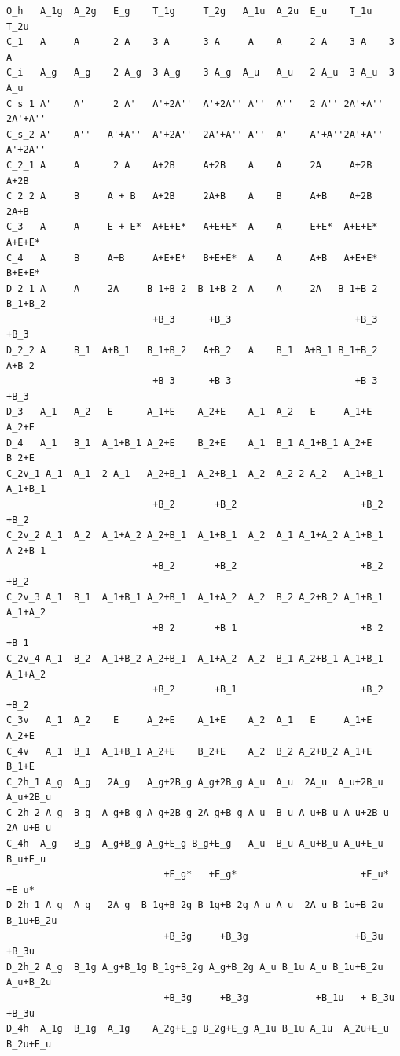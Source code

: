 \documentclass[12pt,a4paper]{article}
\begin{document}
\begin{verbatim}
O_h   A_1g  A_2g   E_g    T_1g     T_2g   A_1u  A_2u  E_u    T_1u   T_2u
C_1   A     A      2 A    3 A      3 A     A    A     2 A    3 A    3 A
C_i   A_g   A_g    2 A_g  3 A_g    3 A_g  A_u   A_u   2 A_u  3 A_u  3 A_u
C_s_1 A'    A'     2 A'   A'+2A''  A'+2A'' A''  A''   2 A'' 2A'+A'' 2A'+A''
C_s_2 A'    A''   A'+A''  A'+2A''  2A'+A'' A''  A'    A'+A''2A'+A'' A'+2A''
C_2_1 A     A      2 A    A+2B     A+2B    A    A     2A     A+2B   A+2B   
C_2_2 A     B     A + B   A+2B     2A+B    A    B     A+B    A+2B   2A+B
C_3   A     A     E + E*  A+E+E*   A+E+E*  A    A     E+E*  A+E+E*  A+E+E*
C_4   A     B     A+B     A+E+E*   B+E+E*  A    A     A+B   A+E+E*  B+E+E*
D_2_1 A     A     2A     B_1+B_2  B_1+B_2  A    A     2A   B_1+B_2  B_1+B_2
                          +B_3      +B_3                      +B_3     +B_3
D_2_2 A     B_1  A+B_1   B_1+B_2   A+B_2   A    B_1  A+B_1 B_1+B_2  A+B_2
                          +B_3      +B_3                      +B_3   +B_3
D_3   A_1   A_2   E      A_1+E    A_2+E    A_1  A_2   E     A_1+E   A_2+E
D_4   A_1   B_1  A_1+B_1 A_2+E    B_2+E    A_1  B_1 A_1+B_1 A_2+E   B_2+E
C_2v_1 A_1  A_1  2 A_1   A_2+B_1  A_2+B_1  A_2  A_2 2 A_2   A_1+B_1 A_1+B_1
                          +B_2       +B_2                      +B_2    +B_2
C_2v_2 A_1  A_2  A_1+A_2 A_2+B_1  A_1+B_1  A_2  A_1 A_1+A_2 A_1+B_1 A_2+B_1
                          +B_2       +B_2                      +B_2    +B_2
C_2v_3 A_1  B_1  A_1+B_1 A_2+B_1  A_1+A_2  A_2  B_2 A_2+B_2 A_1+B_1 A_1+A_2
                          +B_2       +B_1                      +B_2    +B_1
C_2v_4 A_1  B_2  A_1+B_2 A_2+B_1  A_1+A_2  A_2  B_1 A_2+B_1 A_1+B_1 A_1+A_2
                          +B_2       +B_1                      +B_2    +B_2
C_3v   A_1  A_2    E     A_2+E    A_1+E    A_2  A_1   E     A_1+E   A_2+E
C_4v   A_1  B_1  A_1+B_1 A_2+E    B_2+E    A_2  B_2 A_2+B_2 A_1+E   B_1+E
C_2h_1 A_g  A_g   2A_g   A_g+2B_g A_g+2B_g A_u  A_u  2A_u  A_u+2B_u A_u+2B_u
C_2h_2 A_g  B_g  A_g+B_g A_g+2B_g 2A_g+B_g A_u  B_u A_u+B_u A_u+2B_u 2A_u+B_u
C_4h  A_g   B_g  A_g+B_g A_g+E_g B_g+E_g   A_u  B_u A_u+B_u A_u+E_u B_u+E_u
                            +E_g*   +E_g*                      +E_u*   +E_u*
D_2h_1 A_g  A_g   2A_g  B_1g+B_2g B_1g+B_2g A_u A_u  2A_u B_1u+B_2u B_1u+B_2u
                            +B_3g     +B_3g                   +B_3u     +B_3u
D_2h_2 A_g  B_1g A_g+B_1g B_1g+B_2g A_g+B_2g A_u B_1u A_u B_1u+B_2u A_u+B_2u
                            +B_3g     +B_3g            +B_1u   + B_3u  +B_3u
D_4h  A_1g  B_1g  A_1g    A_2g+E_g B_2g+E_g A_1u B_1u A_1u  A_2u+E_u B_2u+E_u

\end{verbatim}
\end{document}
